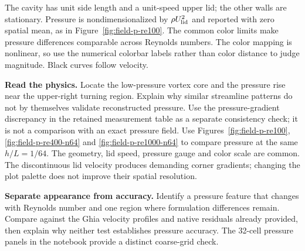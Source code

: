 The cavity has unit side length and a unit-speed upper lid; the other walls are
stationary. Pressure is nondimensionalized by $\rho U_{\rm lid}^2$ and reported
with zero spatial mean, as in Figure~\ref{fig:field-p-re100}.
The common color limits make pressure differences comparable across Reynolds
numbers. The color mapping is nonlinear, so use the numerical colorbar labels
rather than color distance to judge magnitude. Black curves follow velocity.

\textbf{Read the physics.} Locate the low-pressure vortex core and the pressure
rise near the upper-right turning region. Explain why similar streamline
patterns do not by themselves validate reconstructed pressure. Use the
pressure-gradient discrepancy in the retained measurement table as a separate
consistency check; it is not a comparison with an exact pressure field.
\newpage
{}
Use Figures~\ref{fig:field-p-re100}, \ref{fig:field-p-re400-n64} and
\ref{fig:field-p-re1000-n64} to compare pressure at the same $h/L=1/64$.
The geometry, lid speed, pressure gauge and color scale are common. The
discontinuous lid velocity produces demanding corner gradients; changing the
plot palette does not improve their spatial resolution.

\textbf{Separate appearance from accuracy.} Identify a pressure feature that
changes with Reynolds number and one region where formulation differences
remain. Compare against the Ghia velocity profiles and native residuals already
provided, then explain why neither test establishes pressure accuracy. The
32-cell pressure panels in the notebook provide a distinct coarse-grid check.
